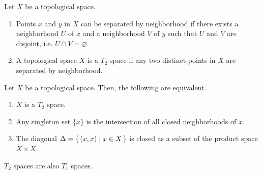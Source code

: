 \begin{defbox}
    \begin{definition}[\(T_2\) Space]
        Let \(X\) be a {\color{mathif}topological space}.
        \begin{enumerate}
            \item {\color{mathobj}Points} \(x\) and \(y\) in \(X\) can be {\color{maththen}separated by neighborhood} if there exists a {\color{mathif}neighborhood} \(U\) of \(x\) and a {\color{mathif}neighborhood} \(V\) of \(y\) such that \(U\) and \(V\) are {\color{mathif}disjoint}, i.e. \(U \cap V = \varnothing\).
            \item A {\color{mathobj}topological space} \(X\) is a {\color{maththen}\(T_2\) space} if any two distinct points in \(X\) are {\color{mathif}separated by neighborhood}.
        \end{enumerate}
    \end{definition}
\end{defbox}
%
\begin{thmbox}
    \begin{proposition}
        Let \(X\) be a {\color{mathif}topological space}. Then, the following are {\color{mathrem}equivalent}.
        \begin{enumerate}
            \item \(X\) is a {\color{maththen}\(T_2\) space}.
            \item Any singleton set \(\{x\}\) is the intersection of all closed neighborhoods of \(x\).
            \item The diagonal \(\Delta = \left\{\, (x, x) \mid x \in X \,\right\}\) is closed as a subset of the product space \(X \times X\).
        \end{enumerate}
    \end{proposition}
\end{thmbox}
%
\begin{thmbox}
    \begin{proposition}
        \(T_2\) spaces are also \(T_1\) spaces.
    \end{proposition}
\end{thmbox}
\newpage

